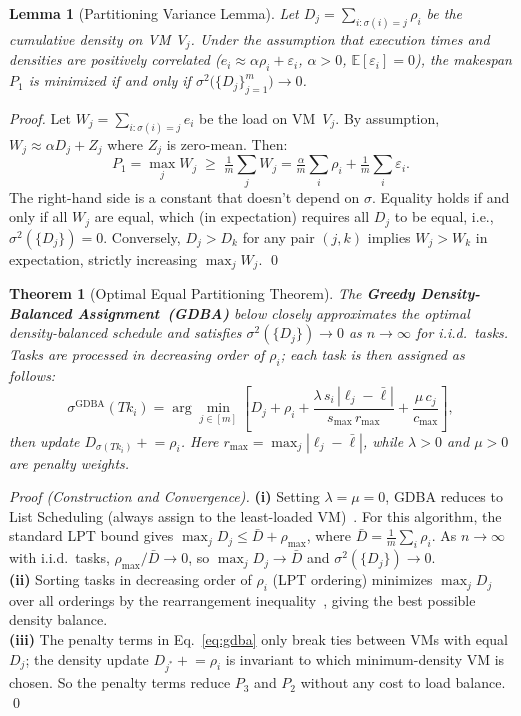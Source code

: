 \documentclass[journal]{IEEEtran}
\newtheorem{lemma}{Lemma}
\newtheorem{theorem}{Theorem}
\begin{document}
\begin{lemma}[Partitioning Variance Lemma]
\label{lem:variance}
Let $D_j=\sum_{i:\sigma(i)=j}\rho_i$ be the cumulative density on VM~$V_j$. Under the
assumption that execution times and densities are positively correlated
($e_i\approx\alpha\rho_i+\varepsilon_i$, $\alpha>0$, $\mathbb{E}[\varepsilon_i]=0$),
the makespan $P_1$ is minimized \emph{if and only if}
$\sigma^2\!\bigl(\{D_j\}_{j=1}^m\bigr)\to0$.
\end{lemma}

\begin{proof}
Let $W_j=\sum_{i:\sigma(i)=j}e_i$ be the load on VM~$V_j$.
By assumption, $W_j\approx\alpha D_j+Z_j$ where $Z_j$ is zero-mean.
Then:
\[
  P_1=\max_jW_j\;\ge\;\tfrac{1}{m}\textstyle\sum_jW_j
      =\tfrac{\alpha}{m}\textstyle\sum_i\rho_i+\tfrac{1}{m}\textstyle\sum_i\varepsilon_i.
\]
The right-hand side is a constant that doesn't depend on $\sigma$.
Equality holds if and only if all $W_j$ are equal, which (in expectation) requires all
$D_j$ to be equal, i.e., $\sigma^2(\{D_j\})=0$. Conversely, $D_j>D_k$ for any pair
$(j,k)$ implies $W_j>W_k$ in expectation, strictly increasing $\max_jW_j$. \qed
\end{proof}

\begin{theorem}[Optimal Equal Partitioning Theorem]
\label{thm:oep}
The \textbf{Greedy Density-Balanced Assignment~(GDBA)} below closely approximates the
optimal density-balanced schedule and satisfies $\sigma^2(\{D_j\})\to0$ as $n\to\infty$
for i.i.d.\ tasks. Tasks are processed in decreasing order of $\rho_i$; each task is then assigned as follows:
\begin{equation}
  \sigma^{\mathrm{GDBA}}(Tk_i)
  =\arg\min_{j\in[m]}\!\left[
     D_j+\rho_i
     +\frac{\lambda\,s_i\,|\ell_j-\bar{\ell}|}{s_{\max}\,r_{\max}}
     +\frac{\mu\,c_j}{c_{\max}}
   \right],
  \label{eq:gdba}
\end{equation}
then update $D_{\sigma(Tk_i)}\mathrel{+}=\rho_i$.
Here $r_{\max}=\max_j|\ell_j-\bar{\ell}|$, while $\lambda>0$ and $\mu>0$ are penalty weights.
\end{theorem}

\begin{proof}[Proof (Construction and Convergence)]
\textbf{(i)} Setting $\lambda=\mu=0$, GDBA reduces to List Scheduling (always assign
to the least-loaded VM)~\cite{graham1969}. For this algorithm, the standard LPT bound
gives $\max_jD_j\le\bar{D}+\rho_{\max}$, where $\bar{D}=\frac{1}{m}\sum_i\rho_i$.
As $n\to\infty$ with i.i.d.\ tasks, $\rho_{\max}/\bar{D}\to0$, so
$\max_jD_j\to\bar{D}$ and $\sigma^2(\{D_j\})\to0$.\\[2pt]
\textbf{(ii)} Sorting tasks in decreasing order of $\rho_i$ (LPT ordering) minimizes
$\max_jD_j$ over all orderings by the rearrangement inequality~\cite{graham1969},
giving the best possible density balance.\\[2pt]
\textbf{(iii)} The penalty terms in Eq.~\eqref{eq:gdba} only break ties between VMs
with equal $D_j$; the density update $D_{j^*}\mathrel{+}=\rho_i$ is invariant to which
minimum-density VM is chosen. So the penalty terms reduce $P_3$ and $P_2$ without any
cost to load balance. \qed
\end{proof}
\end{document}
